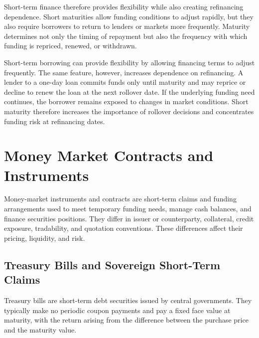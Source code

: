 Short-term finance therefore provides flexibility while also creating refinancing dependence. Short maturities allow funding conditions to adjust rapidly, but they also require borrowers to return to lenders or markets more frequently. Maturity determines not only the timing of repayment but also the frequency with which funding is repriced, renewed, or withdrawn.

\begin{tcolorbox}[
    enhanced,
    breakable,
    colback=white,
    colframe=FinanceBlue,
    boxrule=0.7pt,
    sharp corners,
    borderline west={2.2pt}{0pt}{FinanceBlue},
    title=\textbf{Financial Perspective: Short Maturity and Rollover Dependence},
    coltitle=white,
    colbacktitle=FinanceBlue,
    fonttitle=\bfseries,
    before skip=1.2em,
    after skip=1.2em
]

Short-term borrowing can provide flexibility by allowing financing terms to adjust frequently. The same feature, however, increases dependence on refinancing. A lender to a one-day loan commits funds only until maturity and may reprice or decline to renew the loan at the next rollover date. If the underlying funding need continues, the borrower remains exposed to changes in market conditions. Short maturity therefore increases the importance of rollover decisions and concentrates funding risk at refinancing dates.

\end{tcolorbox}

\section{Money Market Contracts and Instruments}

Money-market instruments and contracts are short-term
claims and funding arrangements used to meet temporary
funding needs, manage cash balances, and finance
securities positions. They differ in issuer or
counterparty, collateral, credit exposure, tradability,
and quotation conventions. These differences affect
their pricing, liquidity, and risk.

\subsection{Treasury Bills and Sovereign Short-Term Claims}

Treasury bills are short-term debt securities issued by central governments. They typically make no periodic coupon payments and pay a fixed face value at maturity, with the return arising from the difference between the purchase price and the maturity value.

